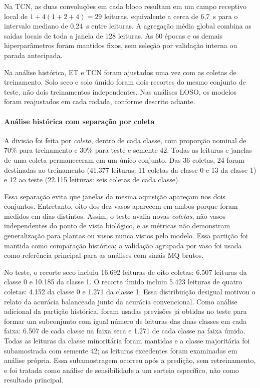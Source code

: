 Na TCN, as duas convoluções em cada bloco resultam em um campo
receptivo local de $1+4(1+2+4)=29$ leituras, equivalente a cerca de
6,7~s para o intervalo mediano de 0,24~s entre leituras. A agregação
média global combina as saídas locais de toda a janela de 128 leituras.
As 60 épocas e os demais hiperparâmetros foram mantidos fixos, sem
seleção por validação interna ou parada antecipada.

Na análise histórica, ET e TCN foram ajustados uma vez com as coletas
de treinamento. Solo seco e solo úmido foram dois recortes do mesmo
conjunto de teste, não dois treinamentos independentes. Nas análises
LOSO, os modelos foram reajustados em cada rodada, conforme descrito
adiante.

\paragraph{Análise histórica com separação por coleta}
\label{subsec:treinamento_teste}

A divisão foi feita por \emph{coleta}, dentro de cada classe, com
proporção nominal de 70\% para treinamento e 30\% para teste e semente 42.
Todas as leituras e janelas de uma coleta permaneceram em um único conjunto.
Das 36 coletas, 24 foram destinadas ao treinamento (41.377 leituras: 11
coletas da classe 0 e 13 da classe 1) e 12 ao teste (22.115 leituras:
seis coletas de cada classe).

Essa separação evita que janelas da mesma aquisição apareçam nos dois
conjuntos. Entretanto, oito dos dez vasos aparecem em ambos porque foram
medidos em dias distintos. Assim, o teste avalia novas \emph{coletas}, não vasos
independentes do ponto de vista biológico, e as métricas não demonstram generalização
para plantas ou vasos nunca vistos pelo modelo. Essa partição foi mantida
como comparação histórica; a validação agrupada por vaso foi usada como
referência principal para as análises com sinais MQ brutos.

No teste, o recorte seco incluiu 16.692 leituras de oito coletas: 6.507
leituras da classe 0 e 10.185 da classe 1. O recorte úmido incluiu 5.423
leituras de quatro coletas: 4.152 da classe 0 e 1.271 da classe 1. Essa
distribuição desigual motivou o relato da acurácia balanceada junto da
acurácia convencional. Como análise adicional da partição histórica,
foram usadas previsões já obtidas no teste para formar um subconjunto
com igual número de leituras das duas classes em cada faixa: 6.507 de
cada classe na faixa seca e 1.271 de cada classe na faixa úmida. Todas
as leituras da classe minoritária foram mantidas e a classe majoritária
foi subamostrada com semente 42; as leituras excedentes foram examinadas
em análise própria. Essa subamostragem ocorreu após a predição,
sem retreinamento, e foi tratada como análise de sensibilidade a um
sorteio específico, não como resultado principal.

